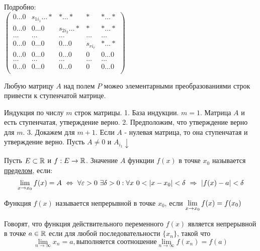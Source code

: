 Подробно:\\
$\begin{pmatrix}
  0\ldots0 & s_{1i_1}\ldots* & *\ldots* & * & *\ldots* \\
  0\ldots0 & 0\ldots0 & s_{2i_2}\ldots* & * & *\ldots* \\
  \ldots & \ldots & \ldots & \ldots & \ldots \\
  0\ldots0 & 0\ldots0 & 0\ldots0 & s_{ri_r} & *\ldots* \\
  0\ldots0 & 0\ldots0 & 0\ldots0 & 0 & 0\ldots0 \\
  \ldots & \ldots & \ldots & \ldots & \ldots \\
  0\ldots0 & 0\ldots0 & 0\ldots0 & 0 & 0\ldots0 \\
\end{pmatrix}$

\begin{proofs}
	Любую матрицу $A$ над полем $P$ можео элементарными преобразованиями строк привести к ступенчатой матрице.
	\begin{dokvo}
    Индукция по числу $m$ строк матрицы.
    1. База индукции. $m = 1$. Матрица $A$ и есть ступенчатая, утверждение верно.
    2. Предположим, что утверждение верно для $m$.
    3. Докажем для $m + 1$.
    Если $A$ - нулевая матрица, то она ступенчатая и утверждение верно.
    Пусть $A \neq 0$ и $A_{i_1}\downarrow$
	\end{dokvo}
\end{proofs}

\begin{DEF}
	Пусть $E \subset \mathbb{R}$ и $f: E \to \mathbb{R}$. Значение $A$ функции $f(x)$ в точке $x_0$ называется \underline{пределом}, если:
	$$\lim_{x\to x_0} f(x) = A \ \Leftrightarrow \ \forall \varepsilon > 0 \ \exists \delta > 0: \forall x \ 0 < \left| x - x_0\right| < \delta \ \Rightarrow \ \left| f(x) - a\right| < \delta$$
\end{DEF}

\begin{DEF}
	Функция $f(x)$ называется непрерывной в точке $x_0$, если $\lim\limits_{x \to x_0}f(x) = f(x_0)$
\end{DEF}

\begin{DEF}
	Говорят, что функция действительного переменного $f(x)$ является непрерывной в точке $a \in \mathbb{R}$ если для любой последовательности $\{x_n\}$, такой что
	$$\lim_{n \to \infty}x_n = a, \text{выполняется соотношение} \lim_{n \to \infty}f(x_n) = f(a)$$
\end{DEF}

